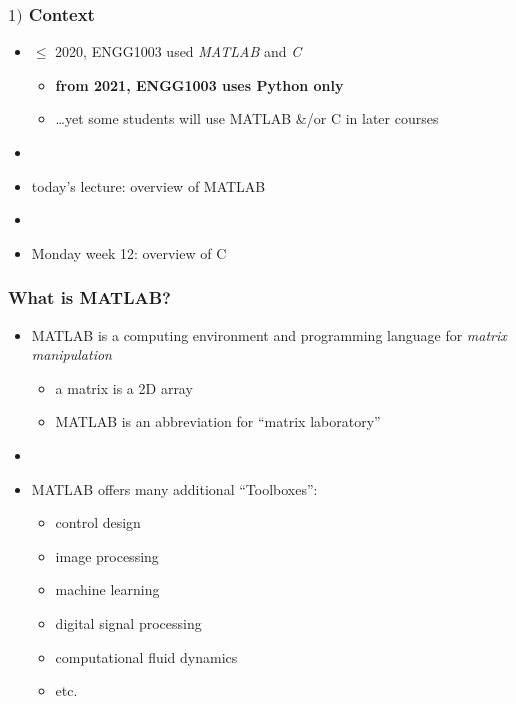 \documentclass[english,14pt]{beamer}
\newcommand\red[1]{{\color{red} #1}}
\begin{document}
\begin{frame}[fragile]

\frametitle{$1)$ Context}

\begin{itemize}
	\item $\leq$ 2020, ENGG1003 used \red{\emph{MATLAB}} and \red{\emph{C}}
	\begin{itemize}
		\item \textbf{from 2021, ENGG1003 uses Python only} %
		\item \ldots yet some students will use MATLAB \&/or C in later courses
	\end{itemize}
	\item[]
	\item today's lecture: overview of MATLAB
	\item[]
	\item Monday week 12: overview of C

\end{itemize}

\end{frame}


\begin{frame}[fragile]

\frametitle{What is MATLAB?}

\begin{itemize}
	\item MATLAB is a computing environment and programming language for \emph{matrix manipulation}
	\begin{itemize}
		\item a matrix is a 2D array
		\item MATLAB is an abbreviation for ``matrix laboratory''
	\end{itemize}
	\item[]
	\item MATLAB offers many additional ``Toolboxes'':
	\begin{itemize}
		\item control design
		\item image processing
		\item machine learning
		\item digital signal processing
		\item computational fluid dynamics
		\item etc.
	\end{itemize}
\end{itemize}

\end{frame}
\end{document}
